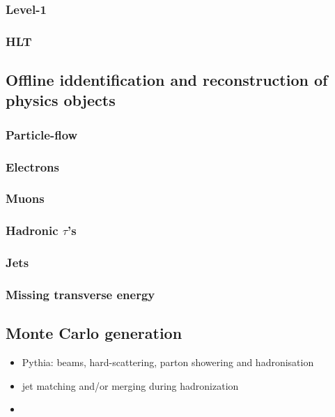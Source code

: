 \documentclass[11pt]{article}
\begin{document}
\subsubsection{Level-1}
\label{sec:org8194ebd}
\subsubsection{HLT}
\label{sec:org4af2f70}

\subsection{Offline iddentification and reconstruction of physics objects}
\label{sec:org19d269c}
\subsubsection{Particle-flow}
\label{sec:org0cfa092}
\subsubsection{Electrons}
\label{sec:orgaa792a4}
\subsubsection{Muons}
\label{sec:orgac79eae}
\subsubsection{Hadronic \(\tau\)'s}
\label{sec:org160c37e}
\subsubsection{Jets}
\label{sec:orgde795d2}
\subsubsection{Missing transverse energy}
\label{sec:orgf40c820}
\subsection{Monte Carlo generation}
\label{sec:org629fb65}
\begin{itemize}
\item Pythia: beams, hard-scattering, parton showering and hadronisation
\item jet matching and/or merging during hadronization
\item 
\end{itemize}
\end{document}
